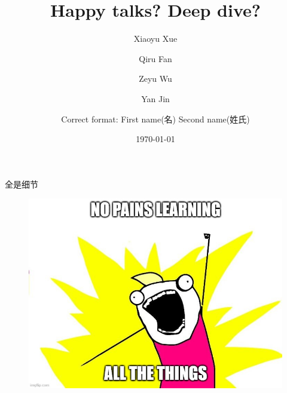 \documentclass[a4paper, 11pt]{article}
\newcommand\bold[1]{\textbf{#1}}
\begin{document}
\title{\huge{\bold{Happy talks? Deep dive?}}}
\author{Xiaoyu Xue\\
\and
Qiru Fan
\and
Zeyu Wu
\and
Yan Jin
\and
Correct format: First name(名) \space\space Second name(姓氏)
}
\date{\today}
\maketitle

\begin{center}
\tiny{全是细节}
\end{center}

\vspace{2cm}

\begin{figure}[!h]
\centering
\includegraphics[scale=0.6]{./Assets/TitleFigure.jpg}
\end{figure}
\newpage
\tableofcontents





\end{document}
